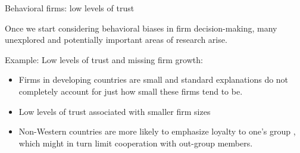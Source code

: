 \documentclass[aspectratio=169, 10pt, handout]{beamer}
\newenvironment{wideitemize}{\itemize\addtolength{\itemsep}{10pt}}{\enditemize}
\begin{document}
\begin{frame}{Behavioral firms: low levels of trust}

\begin{wideitemize}

	\item Once we start considering behavioral biases in firm decision-making, many unexplored and potentially important areas of research arise. 
	
	\item Example: Low levels of trust and missing firm growth:

	\begin{itemize}
	
		\item Firms in developing countries are small and standard explanations do not completely account for just how small these firms tend to be.
	
		\item Low levels of trust associated with smaller firm sizes \cite{cingano2012trust,algan2014trust}
		
		\item Non-Western countries are more likely to emphasize loyalty to one's group \citep{haidt2012righteous}, which might in turn limit cooperation with out-group members.

	\end{itemize}
	
\end{wideitemize}


\end{frame}
\end{document}
